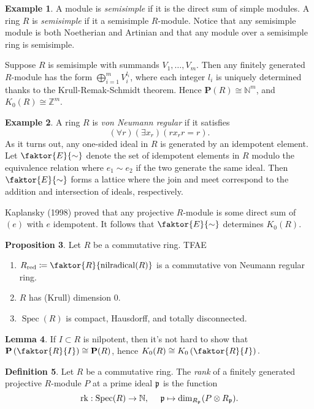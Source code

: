 \documentclass[10pt,letterpaper,cm]{nupset}
\theoremstyle{definition}
\newtheorem{definition}{Definition}[section]
\newtheorem{exmp}[definition]{Example}
\theoremstyle{theorem}
\newtheorem{lemma}[definition]{Lemma}
\newtheorem{prop}[definition]{Proposition}
\theoremstyle{remark}
\newcommand{\N}{\mathbb N}
\renewcommand{\P}{\mathbf P}
\newcommand{\Z}{\mathbb Z}
\newcommand{\1}{\mathbf{1}}
\newcommand{\0}{\vec 0}
\DeclareMathOperator{\nilrad}{nilradical}
\DeclareMathOperator{\red}{red}
\DeclareMathOperator{\spec}{Spec}
\DeclareMathOperator{\rk}{rk}
\begin{document}
\begin{exmp}
A module is \textit{semisimple} if it is the direct sum of simple modules. A ring $R$ is  \textit{semisimple} if it a semisimple $R$-module. Notice that any semisimple module is both Noetherian and Artinian and that any module over a semisimple ring is semisimple. 

 Suppose $R$ is semisimple with summands $V_1, \ldots, V_m$. Then any finitely generated $R$-module has the form $\bigoplus_{i=1}^m V_i^{l_i}$, where each integer $l_i$ is uniquely determined thanks to the Krull-Remak-Schmidt theorem. Hence $\P(R) \cong \N^m$, and $K_0(R) \cong \Z^m$.
\end{exmp}

\begin{exmp}
A ring $R$ is \textit{von Neumann regular} if it satisfies $$\left(\forall{r} \right)\left(\exists{x_r}\right)\left(rx_rr=r\right).$$ As it turns out, any one-sided ideal in $R$ is generated by an idempotent element. Let $\faktor{E}{\sim}$ denote the set of idempotent elements in $R$ modulo the equivalence relation where $e_1 \sim e_2$ if the two generate the same ideal. Then  $\faktor{E}{\sim}$  forms a lattice where the join and meet correspond to the addition and intersection of ideals, respectively.

\smallskip

 Kaplansky (1998) proved that any projective $R$-module is some direct sum of $\left(e\right)$ with $e$ idempotent. It follows that $\faktor{E}{\sim}$ determines $K_0(R)$.
\end{exmp}

\begin{prop}\label{Krull}
Let $R$ be a commutative ring. TFAE
\begin{enumerate}
\item $R_{\red}\coloneqq \faktor{R}{\nilrad(R)}$ is a commutative von Neumann regular ring.
\item $R$ has (Krull) dimension $0$.
\item $\spec(R)$ is compact, Hausdorff, and totally disconnected.
\end{enumerate}
\end{prop}

\begin{lemma}\label{L5}
If $I\subset R$ is nilpotent, then it's not hard to show that $\P\left(\faktor{R}{I}\right) \cong \P(R)$, hence $K_0(R) \cong K_0\left(\faktor{R}{I}\right).$
\end{lemma}

\begin{definition}
Let $R$ be a commutative ring. The \textit{rank} of a finitely generated projective $R$-module $P$ at a prime ideal $\frak{p}$ is the function $$\rk: \spec(R) \to \N,\  \quad \frak{p} \mapsto \dim_{R_{\frak{p}}} (P \otimes R_{\frak{p}}).$$
\end{definition}
\end{document}
